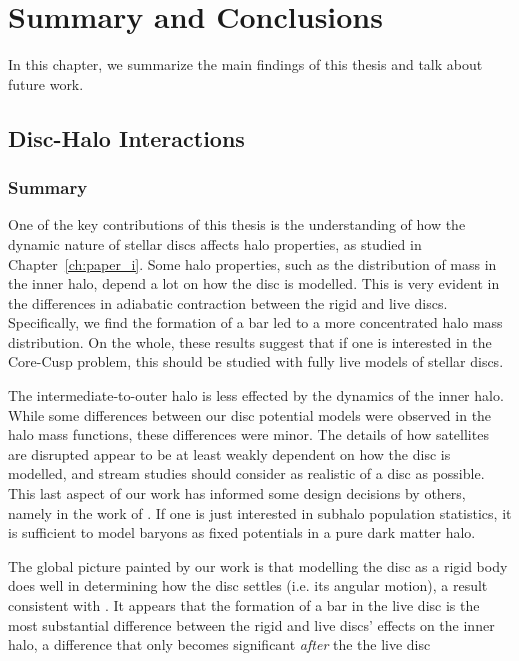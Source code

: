 \chapter{Summary and Conclusions}\label{ch:conclusion}
\newpage


In this chapter, we summarize the  main findings of this thesis and talk about future work.


\section{Disc-Halo Interactions}


\subsection{Summary}

One of the key contributions of this thesis is the understanding of how the dynamic nature of stellar discs affects halo properties, as studied in Chapter~\ref{ch:paper_i}. Some halo properties, such as the distribution of mass in the inner halo, depend a lot on how the disc is modelled. This is very evident in the differences in adiabatic contraction between the rigid and live discs. Specifically, we find the formation of a bar led to a more concentrated halo mass distribution. On the whole, these results suggest that if one is interested in the Core-Cusp problem, this should be studied with fully live models of stellar discs.

The intermediate-to-outer halo is less effected by the dynamics of the inner halo. While some differences between our disc potential models were observed in the halo mass functions, these differences were minor. The details of how satellites are disrupted appear to be at least weakly dependent on how the disc is modelled, and stream studies should consider as realistic of a disc as possible. This last aspect of our work has informed some design decisions by others, namely in the work of \citet{read_2019}. If one is just interested in subhalo population statistics, it is sufficient to model baryons as fixed potentials in a pure dark matter halo.

The global picture painted by our work is that modelling the disc as a rigid body does well in determining how the disc settles (i.e. its angular motion), a result consistent with \citet{DubinskiKuijkenRigidDisks}. It appears that the formation of a bar in the live disc is the most substantial difference between the rigid and live discs' effects on the inner halo, a difference that only becomes significant \textit{after} the the live disc



